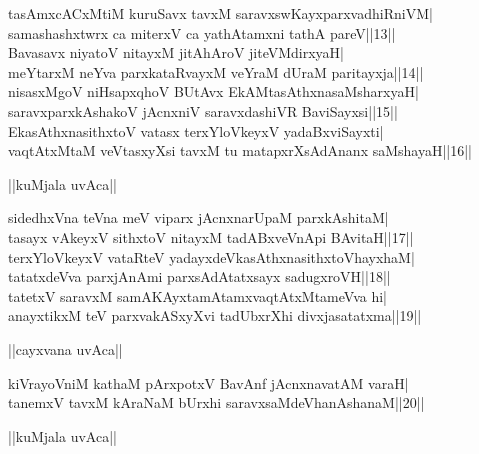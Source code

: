 \documentclass{article}
\begin{document}
tasAmxcACxMtiM kuruSavx tavxM saravxswKayxparxvadhiRniVM|\\
samashashxtwrx ca miterxV ca yathAtamxni tathA pareV||13||\\
Bavasavx niyatoV nitayxM jitAhAroV jiteVMdirxyaH|\\
meYtarxM neYva parxkataRvayxM veYraM dUraM paritayxja||14||\\
nisasxMgoV niHsapxqhoV BUtAvx EkAMtasAthxnasaMsharxyaH|\\
saravxparxkAshakoV jAcnxniV saravxdashiVR BaviSayxsi||15||\\
EkasAthxnasithxtoV vatasx terxYloVkeyxV yadaBxviSayxti|\\
vaqtAtxMtaM veVtasxyXsi tavxM tu matapxrXsAdAnanx saMshayaH||16||\\

\begin{center}
||kuMjala uvAca||
\end{center}

sidedhxVna teVna meV viparx jAcnxnarUpaM parxkAshitaM|\\
tasayx vAkeyxV sithxtoV nitayxM tadABxveVnApi BAvitaH||17||\\
terxYloVkeyxV vataRteV yadayxdeVkasAthxnasithxtoVhayxhaM|\\
tatatxdeVva parxjAnAmi parxsAdAtatxsayx sadugxroVH||18||\\
tatetxV saravxM samAKAyxtamAtamxvaqtAtxMtameVva hi|\\
anayxtikxM teV parxvakASxyXvi tadUbxrXhi divxjasatatxma||19||\\

\begin{center}
||cayxvana uvAca||
\end{center}

kiVrayoVniM kathaM pArxpotxV BavAnf jAcnxnavatAM varaH|\\
tanemxV tavxM kAraNaM bUrxhi saravxsaMdeVhanAshanaM||20||\\

\begin{center}
||kuMjala uvAca||
\end{center}
\end{document}
